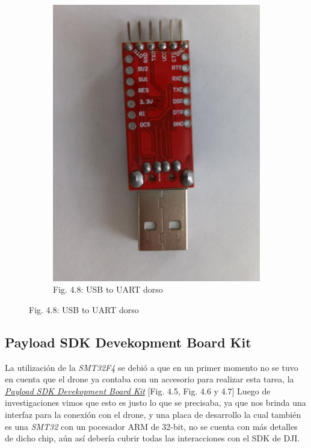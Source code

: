 \documentclass[12pt]{article}
\begin{document}
\begin{figure}[ht]
\begin{subfigure}[b]{0.45\linewidth}
    \includegraphics[width=\linewidth]{images/USB-UART-2.jpg}
    \caption{Fig. 4.8: USB to UART dorso}
  \end{subfigure}
\end{figure}

\subsection{Payload SDK Devekopment Board Kit}
La utilización de la \textit{SMT32F4} se debió a que en un primer momento no se tuvo en cuenta que el drone ya contaba con un accesorio para realizar esta tarea, la \href{https://store.dji.com/product/psdk-development-kit}{\textit{Payload SDK Devekopment Board Kit}} [Fig. 4.5, Fig. 4.6 y 4.7]
Luego de investigaciones vimos que esto es justo lo que se precisaba, ya que nos brinda una interfaz para la conexión con el drone, y una placa de desarrollo la cual también es una \textit{SMT32} con un pocesador ARM de 32-bit, no se cuenta con más detalles de dicho chip, aún así debería cubrir todas las interacciones con el SDK de DJI.
\end{document}
